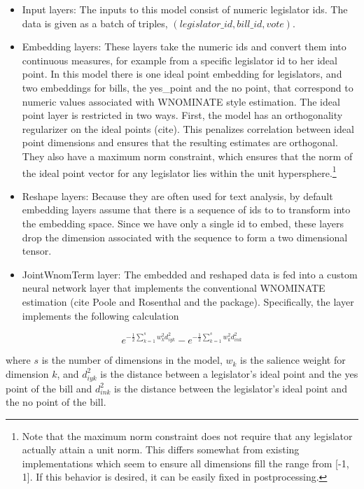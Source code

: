 \documentclass[11pt,]{article}
\begin{document}
\begin{itemize}
\item
  Input layers: The inputs to this model consist of numeric legislator
  ids. The data is given as a batch of triples,
  \((legislator\_id, bill\_id, vote)\).
\item
  Embedding layers: These layers take the numeric ids and convert them
  into continuous measures, for example from a specific legislator id to
  her ideal point. In this model there is one ideal point embedding for
  legislators, and two embeddings for bills, the yes\_point and the no
  point, that correspond to numeric values associated with WNOMINATE
  style estimation. The ideal point layer is restricted in two ways.
  First, the model has an orthogonality regularizer on the ideal points
  (cite). This penalizes correlation between ideal point dimensions and
  ensures that the resulting estimates are orthogonal. They also have a
  maximum norm constraint, which ensures that the norm of the ideal
  point vector for any legislator lies within the unit
  hypersphere.\footnote{Note that the maximum norm constraint does not
    require that any legislator actually attain a unit norm. This
    differs somewhat from existing implementations which seem to ensure
    all dimensions fill the range from {[}-1, 1{]}. If this behavior is
    desired, it can be easily fixed in postprocessing.}
\end{itemize}

\begin{itemize}
\item
  Reshape layers: Because they are often used for text analysis, by
  default embedding layers assume that there is a sequence of ids to to
  transform into the embedding space. Since we have only a single id to
  embed, these layers drop the dimension associated with the sequence to
  form a two dimensional tensor.
\item
  JointWnomTerm layer: The embedded and reshaped data is fed into a
  custom neural network layer that implements the conventional WNOMINATE
  estimation (cite Poole and Rosenthal and the package). Specifically,
  the layer implements the following calculation
\end{itemize}

\[ e^{-\frac{1}{2}\sum_{k=1}^s w_k^2 d_{iyk}^2 } - e^{-\frac{1}{2}\sum_{k=1}^s w_k^2 d_{ink}^2 }\]

where \(s\) is the number of dimensions in the model, \(w_k\) is the
salience weight for dimension \(k\), and \(d_{iyk}^2\) is the distance
between a legislator's ideal point and the yes point of the bill and
\(d_{ink}^2\) is the distance between the legislator's ideal point and
the no point of the bill.
\end{document}
